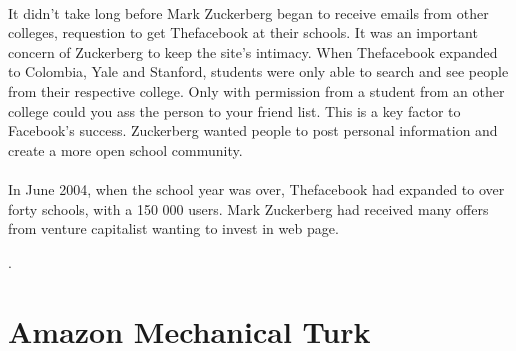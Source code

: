 \paragraph{}
It didn't take long before Mark Zuckerberg began to receive emails from other colleges, requestion to get Thefacebook at their schools. It was an important concern of Zuckerberg to keep the site's intimacy. When Thefacebook expanded to Colombia, Yale and Stanford, students were only able to search and see people from their respective college. Only with permission from a student from an other college could you ass the person to your friend list. This is a key factor to Facebook's success. Zuckerberg wanted people to post personal information and create a more open school community.

\paragraph{}
In June 2004, when the school year was over, Thefacebook had expanded to over forty schools, with a 150 000 users. Mark Zuckerberg had received many offers from venture capitalist wanting to invest in web page. 



\cite{FacebookHistory}.


\section{Amazon Mechanical Turk}


